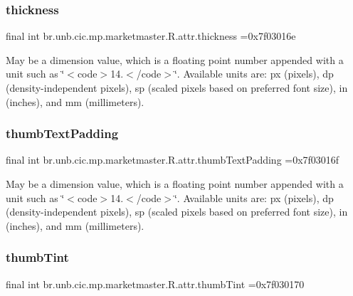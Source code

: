 \subsubsection{\texorpdfstring{thickness}{thickness}}
{\footnotesize\ttfamily final int br.\+unb.\+cic.\+mp.\+marketmaster.\+R.\+attr.\+thickness =0x7f03016e\hspace{0.3cm}{\ttfamily [static]}}

May be a dimension value, which is a floating point number appended with a unit such as \char`\"{}$<$code$>$14.\+5sp$<$/code$>$\char`\"{}. Available units are\+: px (pixels), dp (density-\/independent pixels), sp (scaled pixels based on preferred font size), in (inches), and mm (millimeters). \mbox{\label{classbr_1_1unb_1_1cic_1_1mp_1_1marketmaster_1_1R_1_1attr_a7a423c5b02f08b0fb08738dc9c9e5cdd}} 
\subsubsection{\texorpdfstring{thumb\+Text\+Padding}{thumbTextPadding}}
{\footnotesize\ttfamily final int br.\+unb.\+cic.\+mp.\+marketmaster.\+R.\+attr.\+thumb\+Text\+Padding =0x7f03016f\hspace{0.3cm}{\ttfamily [static]}}

May be a dimension value, which is a floating point number appended with a unit such as \char`\"{}$<$code$>$14.\+5sp$<$/code$>$\char`\"{}. Available units are\+: px (pixels), dp (density-\/independent pixels), sp (scaled pixels based on preferred font size), in (inches), and mm (millimeters). \mbox{\label{classbr_1_1unb_1_1cic_1_1mp_1_1marketmaster_1_1R_1_1attr_a879d72958471514da0c442b4e224949f}} 
\subsubsection{\texorpdfstring{thumb\+Tint}{thumbTint}}
{\footnotesize\ttfamily final int br.\+unb.\+cic.\+mp.\+marketmaster.\+R.\+attr.\+thumb\+Tint =0x7f030170\hspace{0.3cm}{\ttfamily [static]}}


